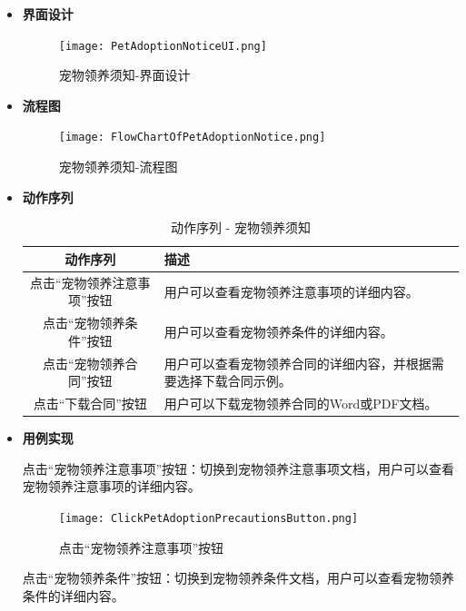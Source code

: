 \begin{itemize}
	\item[] \textbf{界面设计}
	
	\begin{figure}[H]
		\centering
		\texttt{[image: PetAdoptionNoticeUI.png]} 
		\caption{宠物领养须知-界面设计}
		\label{fig:Pet Adoption Notice UI}
	\end{figure}
	
	\item[] \textbf{流程图}
	
	\begin{figure}[H]
		\centering
		\texttt{[image: FlowChartOfPetAdoptionNotice.png]} 
		\caption{宠物领养须知-流程图}
		\label{fig:Flow chart of pet adoption notice}
	\end{figure}
	
	\item[] \textbf{动作序列}
	
	\begin{table}[H]
		\centering
		\caption{动作序列 - 宠物领养须知}
		\renewcommand\arraystretch{1.5}
		\begin{tabular}{|c|>{\raggedright\arraybackslash}p{7cm}|}
			\hline
			\textbf{动作序列} & \textbf{描述} \\ \hline
			点击“宠物领养注意事项”按钮 & 用户可以查看宠物领养注意事项的详细内容。 \\ \hline
			点击“宠物领养条件”按钮 & 用户可以查看宠物领养条件的详细内容。 \\ \hline
			点击“宠物领养合同”按钮 & 用户可以查看宠物领养合同的详细内容，并根据需要选择下载合同示例。 \\ \hline
			点击“下载合同”按钮 & 用户可以下载宠物领养合同的Word或PDF文档。 \\ \hline
		\end{tabular}
		\label{table:adoption-notice-sequence}
	\end{table}
	
	\item[] \textbf{用例实现}
	
	点击“宠物领养注意事项”按钮：切换到宠物领养注意事项文档，用户可以查看宠物领养注意事项的详细内容。
	
	\begin{figure}[H]
		\centering
		\texttt{[image: ClickPetAdoptionPrecautionsButton.png]} 
		\caption{点击“宠物领养注意事项”按钮}
		\label{fig:Click pet adoption precautions button}
	\end{figure}
	
	点击“宠物领养条件”按钮：切换到宠物领养条件文档，用户可以查看宠物领养条件的详细内容。
	

\end{itemize}
